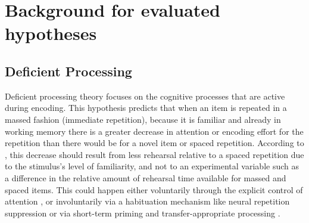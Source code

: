 
\section{Background for evaluated hypotheses}




\subsection{Deficient Processing}

Deficient processing theory focuses on the cognitive processes that are active during encoding.  This hypothesis predicts that when an item is repeated in a massed fashion (immediate repetition), because it is familiar and already in working memory there is a greater decrease in attention or encoding effort for the repetition than there would be for a novel item or spaced repetition.  According to , this decrease should result from less rehearsal relative to a spaced repetition due to the stimulus's level of familiarity, and not to an experimental variable such as a difference in the relative amount of rehearsal time available for massed and spaced items.  This could happen either voluntarily through the explicit control of attention \cite{Gree1989a}, or involuntarily via a habituation mechanism like neural repetition suppression \cite{CallSchw2010,Hint1974,VanSEtal2007,WagnEtal2000,XueEtal2011} or via short-term priming and transfer-appropriate processing \cite{Chal1993,MammEtal2002,RussEtal1998}.



